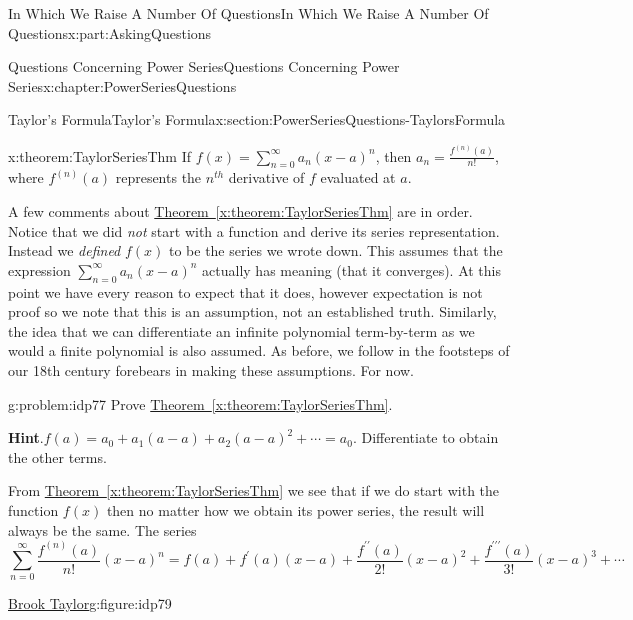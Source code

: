 \documentclass[oneside,10pt,]{book}
\newcommand{\blocktitlefont}{\relax}
\newcommand{\xreffont}{\relax}
\numberwithin{equation}{section}
\begin{document}
\begin{partptx}{In Which We Raise A Number Of Questions}{}{In Which We Raise A Number Of Questions}{}{}{x:part:AskingQuestions}
\begin{chapterptx}{Questions Concerning Power Series}{}{Questions Concerning Power Series}{}{}{x:chapter:PowerSeriesQuestions}
\begin{sectionptx}{Taylor's Formula}{}{Taylor's Formula}{}{}{x:section:PowerSeriesQuestions-TaylorsFormula}
\begin{theorem}{}{}{x:theorem:TaylorSeriesThm}%
 If \(f(x)=\sum_{n=0}^\infty a_n(x-a)^n\), then \(a_n=\frac{f^{(n)}(a)}{n!}\), where \(f^{(n)}(a)\) represents the \(n^{th}\) derivative of \(f\) evaluated at \(a\).%
\end{theorem}
A few comments about \hyperref[x:theorem:TaylorSeriesThm]{Theorem~{\xreffont\ref{x:theorem:TaylorSeriesThm}}} are in order. Notice that we did \emph{not} start with a function and derive its series representation. Instead we \emph{defined} \(f(x)\) to be the series we wrote down. This assumes that the expression \(\sum_{n=0}^\infty a_n(x-a)^n\) actually has meaning (that it converges). At this point we have every reason to expect that it does, however expectation is not proof so we note that this is an assumption, not an established truth. Similarly, the idea that we can differentiate an infinite polynomial term-by-term as we would a finite polynomial is also assumed. As before, we follow in the footsteps of our 18th century forebears in making these assumptions. For now.%
\begin{problem}{}{g:problem:idp77}%
 Prove \hyperref[x:theorem:TaylorSeriesThm]{Theorem~{\xreffont\ref{x:theorem:TaylorSeriesThm}}}.%
\par\smallskip%
\noindent\textbf{\blocktitlefont Hint}.\hypertarget{g:hint:idp78}{}\quad{}\(f(a)=a_0+a_1(a-a)+a_2(a-a)^2+\cdots=a_0\). Differentiate to obtain the other terms.%
\end{problem}
From \hyperref[x:theorem:TaylorSeriesThm]{Theorem~{\xreffont\ref{x:theorem:TaylorSeriesThm}}} we see that if we do start with the function \(f(x)\) then no matter how we obtain its power series, the result will always be the same. The series%
\begin{equation*}
\sum_{n=0}^\infty\frac{f^{(n)}(a)}{n!}(x-a)^n=f(a)+f^\prime(a)(x-a)+\frac{f^{\prime\prime}(a)}{2!}(x-a)^2+\frac{f^{\prime\prime\prime}(a)}{3!}(x-a)^3+\cdots
\end{equation*}
%
\begin{figureptx}{\href{https://mathshistory.st-andrews.ac.uk/Biographies/Taylor/}{Brook Taylor}\protect\footnotemark{}}{g:figure:idp79}{}%
%
\begin{image}{0.325}{0.35}{0.325}%

\end{image}
\end{figureptx}
\end{sectionptx}
\end{chapterptx}
\end{partptx}
\end{document}
